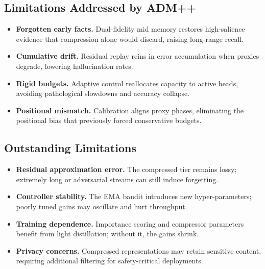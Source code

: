 \documentclass[11pt]{article}
\newcommand{\admpp}{\textsc{ADM++}}
\begin{document}
\subsection{Limitations Addressed by \admpp{}}
\begin{itemize}
  \item \textbf{Forgotten early facts.} Dual-fidelity mid memory restores high-salience evidence that compression alone would discard, raising long-range recall.
  \item \textbf{Cumulative drift.} Residual replay reins in error accumulation when proxies degrade, lowering hallucination rates.
  \item \textbf{Rigid budgets.} Adaptive control reallocates capacity to active heads, avoiding pathological slowdowns and accuracy collapse.
  \item \textbf{Positional mismatch.} Calibration aligns proxy phases, eliminating the positional bias that previously forced conservative budgets.
\end{itemize}

\subsection{Outstanding Limitations}
\begin{itemize}
  \item \textbf{Residual approximation error.} The compressed tier remains lossy; extremely long or adversarial streams can still induce forgetting.
  \item \textbf{Controller stability.} The EMA bandit introduces new hyper-parameters; poorly tuned gains may oscillate and hurt throughput.
  \item \textbf{Training dependence.} Importance scoring and compressor parameters benefit from light distillation; without it, the gains shrink.
  \item \textbf{Privacy concerns.} Compressed representations may retain sensitive content, requiring additional filtering for safety-critical deployments.
\end{itemize}
\end{document}
